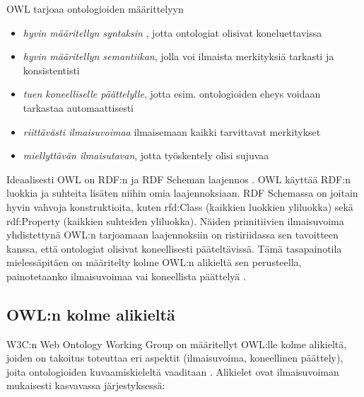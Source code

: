 \documentclass[finnish]{tktltiki2}
\theoremstyle{definition}
\theoremstyle{remark}
\begin{document}
OWL tarjoaa ontologioiden määrittelyyn \cite{AH09} 
\begin{itemize}
\item \textit{hyvin määritellyn syntaksin} , jotta ontologiat olisivat koneluettavissa
\item \textit{hyvin määritellyn semantiikan}, jolla voi ilmaista merkityksiä tarkasti ja konsistentisti
\item \textit{tuen koneelliselle päättelylle}, jotta esim.  ontologioiden eheys voidaan tarkastaa automaattisesti
\item \textit{riittävästi ilmaisuvoimaa} ilmaisemaan kaikki tarvittavat merkitykset
\item \textit{miellyttävän ilmaisutavan}, jotta työskentely olisi sujuvaa
\end{itemize}


Ideaalisesti OWL on RDF:n ja RDF Scheman laajennos \cite{AH09}. OWL käyttää
RDF:n luokkia ja suhteita lisäten niihin omia laajennoksiaan. RDF Schemassa on joitain 
hyvin vahvoja konstruktioita, kuten rfd:Class
(kaikkien luokkien yliluokka) sekä rdf:Property (kaikkien suhteiden yliluokka).
Näiden primitiivien ilmaisuvoima yhdistettynä OWL:n tarjoamaan laajennoksiin
on ristiriidassa sen tavoitteen kanssa, että ontologiat olisivat koneellisesti
pääteltävissä. Tämä tasapainotila mielessäpitäen on määritelty kolme OWL:n
alikieltä sen perusteella, painotetaanko ilmaisuvoimaa vai koneellista päättelyä
\cite{AH09}.  

\subsection{OWL:n kolme alikieltä}

W3C:n Web Ontology Working Group on määritellyt OWL:lle kolme alikieltä, joiden
on takoitus toteuttaa eri aspektit (ilmaisuvoima, koneellinen päättely), joita
ontologioiden kuvaamiskieleltä vaaditaan \cite{MH04}. Alikielet ovat ilmaisuvoiman mukaisesti
kasvavassa järjestyksessä:
\end{document}
